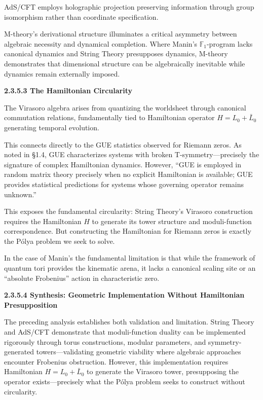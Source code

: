 AdS/CFT employs holographic projection preserving information through group isomorphism rather than coordinate specification.

M-theory's derivational structure illuminates a critical asymmetry between algebraic necessity and dynamical completion. Where Manin's $\mathbb{F}_1$-program lacks canonical dynamics and String Theory presupposes dynamics, M-theory demonstrates that dimensional structure can be algebraically inevitable while dynamics remain externally imposed.

\textbf{2.3.5.3 The Hamiltonian Circularity}

The Virasoro algebra arises from quantizing the worldsheet through canonical commutation relations, fundamentally tied to Hamiltonian operator $H = L_0 + \bar{L}_0$ generating temporal evolution.

This connects directly to the GUE statistics observed for Riemann zeros. As noted in \S 1.4, GUE characterizes systems with broken T-symmetry—precisely the signature of complex Hamiltonian dynamics. However, ``GUE is employed in random matrix theory precisely when no explicit Hamiltonian is available; GUE provides statistical predictions for systems whose governing operator remains unknown.''

This exposes the fundamental circularity: String Theory's Virasoro construction requires the Hamiltonian $H$ to generate its tower structure and moduli-function correspondence. But constructing the Hamiltonian for Riemann zeros is exactly the Pólya problem we seek to solve.

In the case of Manin's the fundamental limitation is that while the framework of quantum tori provides the kinematic arena, it lacks a canonical scaling site or an ``absolute Frobenius'' action in characteristic zero.

\textbf{2.3.5.4 Synthesis: Geometric Implementation Without Hamiltonian Presupposition}

The preceding analysis establishes both validation and limitation. String Theory and AdS/CFT demonstrate that moduli-function duality can be implemented rigorously through torus constructions, modular parameters, and symmetry-generated towers—validating geometric viability where algebraic approaches encounter Frobenius obstruction. However, this implementation requires Hamiltonian $H = L_0 + \bar{L}_0$ to generate the Virasoro tower, presupposing the operator exists—precisely what the Pólya problem seeks to construct without circularity.

